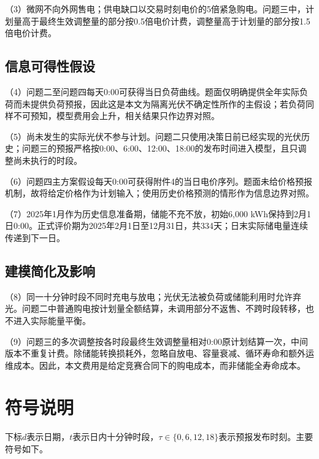 \documentclass[withoutpreface,bwprint]{cumcmthesis}
\begin{document}
（3）微网不向外网售电；供电缺口以交易时刻电价的5倍紧急购电。问题三中，计划量高于最终生效调整量的部分按0.5倍电价计费，调整量高于计划量的部分按1.5倍电价计费。

\subsection{信息可得性假设}

（4）问题二至问题四每天0:00可获得当日负荷曲线。题面仅明确提供全年实际负荷而未提供负荷预报，因此这是本文为隔离光伏不确定性所作的主假设；若负荷同样不可预知，模型费用会上升，相关结果只作边界对照。

（5）尚未发生的实际光伏不参与计划。问题二只使用决策日前已经实现的光伏历史；问题三的预报严格按0:00、6:00、12:00、18:00的发布时间进入模型，且只调整尚未执行的时段。

（6）问题四主方案假设每天0:00可获得附件4的当日电价序列。题面未给价格预报机制，故将给定价格作为计划输入；使用历史价格预测的情形作为信息边界对照。

（7）2025年1月作为历史信息准备期，储能不充不放，初始6,000 kWh保持到2月1日0:00。正式评价期为2025年2月1日至12月31日，共334天；日末实际储电量连续传递到下一日。

\subsection{建模简化及影响}

（8）同一十分钟时段不同时充电与放电；光伏无法被负荷或储能利用时允许弃光。问题二中普通购电按计划量全额结算，未调用部分不返售、不跨时段转移，也不进入实际能量平衡。

（9）问题三的多次调整按各时段最终生效调整量相对0:00原计划结算一次，中间版本不重复计费。除储能转换损耗外，忽略自放电、容量衰减、循环寿命和额外运维成本。因此，本文费用是给定竞赛合同下的购电成本，而非储能全寿命成本。

\section{符号说明}

下标\(d\)表示日期，\(t\)表示日内十分钟时段，\(\tau\in\{0,6,12,18\}\)表示预报发布时刻。主要符号如下。
\end{document}
